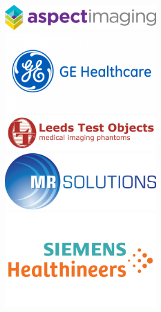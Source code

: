\documentclass[a5paper,10pt,twoside,onecolumn,openany,helvetica,showtrims]{memoir}
\begin{document}
\begin{center}
\vfill
	\includegraphics[width=0.5\textwidth]{Sponsors/converted/aspect_logo}
	\vfill
	\includegraphics[width=0.5\textwidth]{Sponsors/converted/ge_healthcare_logo} \vfill
		\includegraphics[width=0.5\textwidth]{Sponsors/converted/LTO-logo-full-RED-screen}
		\vfill \includegraphics[width=0.5\textwidth]{Sponsors/converted/mrsolutions_logo}\vfill
\includegraphics[width=0.5\textwidth]{Sponsors/converted/siemens_logo}
\vfill
\end{center}

\clearpage
\end{document}
